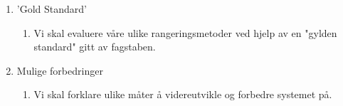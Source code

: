 \begin{enumerate}
\begin{enumerate}
\end{enumerate}
\item{'Gold Standard'}
\begin{enumerate}
\item{Vi skal evaluere våre ulike rangeringsmetoder ved hjelp av en "gylden standard" gitt av fagstaben.}
\end{enumerate}
\item{Mulige forbedringer}
\begin{enumerate}
\item{Vi skal forklare ulike måter å videreutvikle og forbedre systemet på.}
\end{enumerate}
\end{enumerate}
